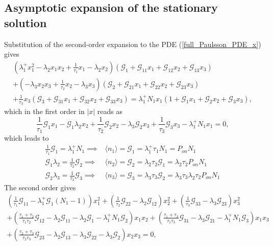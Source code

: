 \documentclass[a4paper, 11pt]{article}
\begin{document}
\subsection{Asymptotic expansion of the stationary solution}
Substitution of the second-order expansion to the PDE (\ref{full_Paulsson_PDE_x}) gives
\begin{equation*}
  \begin{split}
    \left(\lambda_1^+x_1^2-\lambda_2x_1x_2+\frac{1}{\tau_1}x_1-\lambda_2x_2\right)\left({\mathcal G}_1 + {\mathcal G}_{11}x_1 + {\mathcal G}_{12}x_2 + {\mathcal G}_{13}x_3\right)\\
    + \left(-\lambda_3x_2x_3 + \frac{1}{\tau_2}x_2 - \lambda_3x_3\right)\left({\mathcal G}_2 + {\mathcal G}_{21}x_1 + {\mathcal G}_{22}x_2 + {\mathcal G}_{23}x_3\right)\\
    +\frac{1}{\tau_3}x_3\left({\mathcal G}_3 + {\mathcal G}_{31}x_1 + {\mathcal G}_{32}x_2 + {\mathcal G}_{33}x_3\right) = \lambda_1^+N_1x_1\left(1 + {\mathcal G}_1x_1 + {\mathcal G}_2x_2 + {\mathcal G}_3x_3\right),
  \end{split}
\end{equation*}
which in the first order in $|x|$ reads as
\begin{equation*}
  \frac{1}{\tau_1}\mathcal G_1x_1 - \mathcal G_1\lambda_2x_2 + \frac{1}{\tau_2}\mathcal G_2x_2 - \lambda_3\mathcal G_2x_3 + \frac{1}{\tau_3}\mathcal G_3x_3 - \lambda_1^+N_1x_1 = 0,
\end{equation*}
which leads to
\begin{align*}
  \frac{1}{\tau_1}{\mathcal G}_1 = \lambda_1^+N_1\implies&\langle n_1\rangle = {\mathcal G}_1 = \lambda_1^+\tau_1N_1 = P_{on}N_1\\
  {\mathcal G}_1\lambda_2 = \frac{1}{\tau_2}{\mathcal G}_2\implies &\langle n_2\rangle = {\mathcal G}_2=\lambda_2\tau_2{\mathcal G}_1 = \lambda_2\tau_2P_{on}N_1\\
  {\mathcal G}_2\lambda_3 = \frac{1}{\tau_3}{\mathcal G}_3 \implies &\langle n_3\rangle = {\mathcal G}_3 = \lambda_3\tau_3{\mathcal G}_2 = \lambda_3\tau_3\lambda_2\tau_2P_{on}N_1
\end{align*}
The second order gives
\begin{equation*}
  \begin{split}
    \left(\frac{1}{\tau_1}{\mathcal G}_{11} - \lambda_1^+{\mathcal G}_1\left(N_1-1\right)\right)x_1^2
    +\left(\frac{1}{\tau_2}{\mathcal G}_{22} - \lambda_2{\mathcal G}_{12}\right)x_2^2
    + \left(\frac{1}{\tau_3}{\mathcal G_{33}}-\lambda_3{\mathcal G_{23}}\right)x_3^2\\
    + \left(\frac{\tau_1+\tau_2}{\tau_1\tau_2}{\mathcal G}_{12} - \lambda_2{\mathcal G}_{11} - \lambda_2{\mathcal G}_1 - \lambda_1^+N_1{\mathcal G}_2\right)x_1x_2
    + \left(\frac{\tau_1+\tau_3}{\tau_1\tau_3}{\mathcal G}_{31} - \lambda_3{\mathcal G}_{21} - \lambda_1^+N_1{\mathcal G}_3\right)x_1x_3\\
    + \left(\frac{\tau_2+\tau_3}{\tau_2\tau_3}{\mathcal G}_{23} - \lambda_2{\mathcal G}_{13} - \lambda_3{\mathcal G}_{22} - \lambda_3{\mathcal G}_2\right)x_2x_3 = 0,
  \end{split}
\end{equation*}
\end{document}
